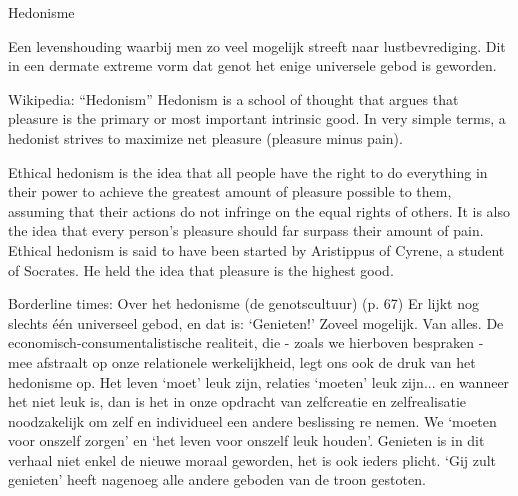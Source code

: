 \documentclass[main.tex]{subfiles}
\begin{document}
\begin{examenvraag}
    \begin{vraag}
        Hedonisme
    \end{vraag}

    \begin{antwoord}
       Een levenshouding waarbij men zo veel mogelijk streeft naar 
       lustbevrediging.‭ ‬Dit in een dermate extreme vorm dat genot het enige 
       universele gebod is geworden.
        \begin{citaat}{Wikipedia: ``Hedonism''}
            Hedonism is a school of thought that argues that pleasure is the primary or most important intrinsic good. In very simple terms, a hedonist strives to maximize net pleasure (pleasure minus pain).

            Ethical hedonism is the idea that all people have the right to do everything in their power to achieve the greatest amount of pleasure possible to them, assuming that their actions do not infringe on the equal rights of others.
            It is also the idea that every person's pleasure should far surpass their amount of pain.
            Ethical hedonism is said to have been started by Aristippus of Cyrene, a student of Socrates.
            He held the idea that pleasure is the highest good.
        \end{citaat}
        \begin{citaat}{Borderline times: Over het hedonisme (de genotscultuur) (p. 67)}
            Er lijkt nog slechts één universeel gebod, en dat is: ‘Genieten!’ Zoveel mogelijk.
            Van alles.
            De economisch-consumentalistische realiteit, die - zoals we hierboven bespraken - mee afstraalt op onze relationele werkelijkheid, legt ons ook de druk van het hedonisme op.
            Het leven ‘moet’ leuk zijn, relaties ‘moeten’ leuk zijn... en wanneer het niet leuk is, dan is het in onze opdracht van zelfcreatie en zelfrealisatie noodzakelijk om zelf en individueel een andere beslissing re nemen.
            We ‘moeten voor onszelf zorgen’ en ‘het leven voor onszelf leuk houden’.
            Genieten is in dit verhaal niet enkel de nieuwe moraal geworden, het is ook ieders plicht.
            ‘Gij zult genieten’ heeft nagenoeg alle andere geboden van de troon gestoten.
        \end{citaat}
    \end{antwoord}
\end{examenvraag}
\end{document}
